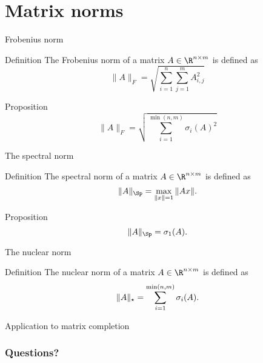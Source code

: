 \documentclass{beamer}
\begin{document}
\section{Matrix norms}

\begin{frame}[t]{Frobenius norm}
	\grid

	\begin{block}{Definition}
		The Frobenius norm of a matrix $A \in \R^{n \times m}$ is defined as
		$$
		\|A\|_F = \sqrt{\sum_{i=1}^n \sum_{j=1}^m A_{i,j}^2}
		$$
	\end{block}
	\begin{block}{Proposition}
		$$
		\|A\|_F = \sqrt{\sum_{i=1}^{\min(n,m)} \sigma_i(A)^2}
		$$
	\end{block}
\end{frame}
\begin{frame}[t]{The spectral norm}
	\grid

	\vspace{-0.4cm}
	\begin{block}{Definition}
		The spectral norm of a matrix $A \in \R^{n \times m}$ is defined as
		$$
		\|A\|_{\Sp} = \max_{\|x\| = 1}	\|Ax\|.
		\vspace{-0.3cm}
		$$
	\end{block}
	\begin{block}{Proposition}
		\vspace{-0.3cm}
		$$
		\|A\|_{\Sp} = \sigma_1(A).
		$$
	\end{block}
\end{frame}

\begin{frame}[t]{The nuclear norm}
	\grid

	\vspace{-0.4cm}
	\begin{block}{Definition}
		The nuclear norm of a matrix $A \in \R^{n \times m}$ is defined as
		$$
		\|A\|_{\star} = \sum_{i=1}^{\min(n,m)} \sigma_i(A).
		\vspace{-0.3cm}
		$$
	\end{block}
\end{frame}

\begin{frame}[t]{Application to matrix completion}
	\grid


	\pause

\end{frame}

\appendix
\backupbegin
\begin{frame}[t]
	\frametitle{Questions?}
	\grid

	\pause
\end{frame}
\backupend
\end{document}
